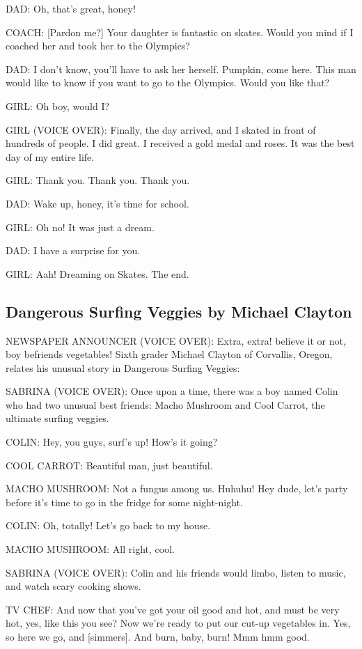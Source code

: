 DAD:
Oh, that's great, honey!

COACH:
[Pardon me?]
Your daughter is fantastic on skates.
Would you mind if I coached her and took her to the Olympics?

DAD:
I don't know, you'll have to ask her herself.
Pumpkin, come here.
This man would like to know if you want to go to the Olympics.
Would you like that?

GIRL:
Oh boy, would I?

GIRL (VOICE OVER):
Finally, the day arrived, and I skated in front of hundreds of people.
I did great.
I received a gold medal and roses.
It was the best day of my entire life.

GIRL:
Thank you.
Thank you.
Thank you.

DAD:
Wake up, honey, it's time for school.

GIRL:
Oh no!
It was just a dream.

DAD:
I have a surprise for you.

GIRL:
Aah!
Dreaming on Skates.
The end.

\subsection{Dangerous Surfing Veggies by Michael Clayton}

NEWSPAPER ANNOUNCER (VOICE OVER):
Extra, extra!
believe it or not, boy befriends vegetables!
Sixth grader Michael Clayton of Corvallis, Oregon, relates his unusual story in Dangerous Surfing Veggies:

SABRINA (VOICE OVER):
Once upon a time, there was a boy named Colin who had two unusual best friends: Macho Mushroom and Cool Carrot, the ultimate surfing veggies.

COLIN:
Hey, you guys, surf's up!
How's it going?

COOL CARROT:
Beautiful man, just beautiful.

MACHO MUSHROOM:
Not a fungus among us.
Huhuhu!
Hey dude, let's party before it's time to go in the fridge for some night-night.

COLIN:
Oh, totally!
Let's go back to my house.

MACHO MUSHROOM:
All right, cool.

SABRINA (VOICE OVER):
Colin and his friends would limbo, listen to music, and watch scary cooking shows.

TV CHEF:
And now that you've got your oil good and hot, and must be very hot, yes, like this you see?
Now we're ready to put our cut-up vegetables in.
Yes, so here we go, and [simmers].
And burn, baby, burn!
Mmm hmm good.

